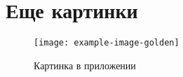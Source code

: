 \chapter{Еще картинки}
\label{cha:appendix2}

\blindtext

\begin{figure}
    \centering
    \texttt{[image: example-image-golden]}
    \caption{Картинка в приложении}
\end{figure}
